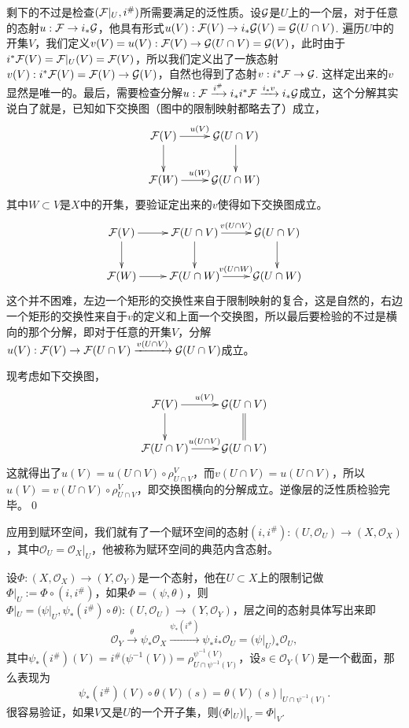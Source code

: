 剩下的不过是检查$(\mathcal{F}|_U,i^\#)$所需要满足的泛性质。设$\mathcal{G}$是$U$上的一个层，对于任意的态射$u:\mathcal{F}\to i_*\mathcal{G}$，他具有形式$u(V):\mathcal{F}(V)\to i_*\mathcal{G}(V)=\mathcal{G}(U\cap V)$. 遍历$U$中的开集$V$，我们定义$v(V)=u(V):\mathcal{F}(V)\to \mathcal{G}(U\cap V)=\mathcal{G}(V)$，此时由于$i^*\mathcal{F}(V)=\mathcal{F}|_U(V)=\mathcal{F}(V)$，所以我们定义出了一族态射$v(V):i^*\mathcal{F}(V)=\mathcal{F}(V)\to \mathcal{G}(V)$，自然也得到了态射$v:i^*\mathcal{F}\to \mathcal{G}$. 这样定出来的$v$显然是唯一的。最后，需要检查分解$u:\mathcal{F}\xrightarrow{i^\#} i_*i^*\mathcal{F} \xrightarrow{i_*v} i_*\mathcal{G}$成立，这个分解其实说白了就是，已知如下交换图（图中的限制映射都略去了）成立，
\[
	\xymatrix{
		\calf(V)\ar[r]^{u(V)} \ar[d]&\calg(U\cap V) \ar[d]\\
		\calf(W)\ar[r]^{u(W)}&\calg(U\cap W)
	}
\]
其中$W\subset V$是$X$中的开集，要验证定出来的$v$使得如下交换图成立。
\[
	\xymatrix{
		\calf(V)\ar[r] \ar[d]&\ar[r]^{v(U\cap V)}\calf(U\cap V) \ar[d]&\calg(U\cap V) \ar[d]\\
		\calf(W)\ar[r]&\ar[r]^{v(U\cap W)}\calf(U\cap W)&\calg(U\cap W)
	}
\]
这个并不困难，左边一个矩形的交换性来自于限制映射的复合，这是自然的，右边一个矩形的交换性来自于$v$的定义和上面一个交换图，所以最后要检验的不过是横向的那个分解，即对于任意的开集$V$，分解$u(V):\mathcal{F}(V)\to \mathcal{F}(U\cap V) \xrightarrow{v(U\cap V)} \mathcal{G}(U\cap V)$成立。

现考虑如下交换图，
\[
	\xymatrix{
		\calf(V)\ar[r]^{u(V)} \ar[d]&\calg(U\cap V) \ar@{=}[d]\\
		\calf(U\cap V)\ar[r]^{u(U\cap V)}&\calg(U\cap V)
	}
\]
这就得出了$u(V)=u(U\cap V)\circ \rho^V_{U\cap V}$，而$v(U\cap V)=u(U\cap V)$，所以$u(V)=v(U\cap V)\circ \rho^V_{U\cap V}$，即交换图横向的分解成立。逆像层的泛性质检验完毕。\qed

\para 应用到赋环空间，我们就有了一个赋环空间的态射$(i,i^\#):(U,\mathcal{O}_U)\to (X,\mathcal{O}_X)$，其中$\mathcal{O}_U=\mathcal{O}_X|_U$，他被称为赋环空间的典范内含态射。

设$\Phi:(X,\mathcal{O}_X)\to (Y,\mathcal{O}_Y)$是一个态射，他在$U\subset X$上的限制记做$\Phi|_U:=\Phi\circ (i,i^\#)$，如果$\Phi=(\psi,\theta)$，则$\Phi|_U=\bigl(\psi|_U, \psi_*(i^\#) \circ \theta\bigr):(U,\mathcal{O}_U)\to (Y,\mathcal{O}_Y)$，层之间的态射具体写出来即
\[
	\mathcal{O}_Y\xrightarrow{\theta} \psi_*\mathcal{O}_X \xrightarrow{\psi_*(i^\#)} \psi_*i_*\mathcal{O}_U=\bigl(\psi|_U\bigr)_*\mathcal{O}_U,
\]
其中$\psi_*(i^\#)(V)=i^\#\bigl(\psi^{-1}(V)\bigr)=\rho^{\psi^{-1}(V)}_{U\cap \psi^{-1}(V)}$，设$s\in \mathcal{O}_Y(V)$是一个截面，那么表现为
\[
	\psi_*(i^\#)(V)\circ \theta(V)(s)=\theta(V)(s)|_{U\cap \psi^{-1}(V)}.
\]
很容易验证，如果$V$又是$U$的一个开子集，则$(\Phi|_U)|_V=\Phi|_V$.

